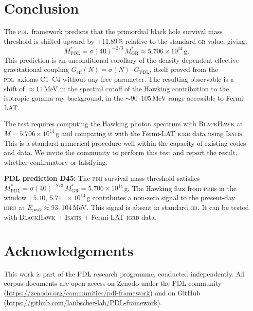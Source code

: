 \documentclass[12pt, a4paper]{article}
\theoremstyle{definition}
\newenvironment{prediction}[1][]{%
  \begin{tcolorbox}[colback=blue!5, colframe=blue!50!black,
    title={\textbf{Falsifiable prediction — #1}}, fonttitle=\bfseries]}
  {\end{tcolorbox}}
\newcommand{\PDL}{\textsc{pdl}}
\newcommand{\Geff}{G_{\mathrm{eff}}}
\newcommand{\GPDL}{G_{\mathrm{PDL}}}
\newcommand{\sigN}{\sigma(N)}
\newcommand{\MstarGR}{M^{*}_{\mathrm{GR}}}
\newcommand{\MstarPDL}{M^{*}_{\mathrm{PDL}}}
\begin{document}
\section{Conclusion}

The \PDL\ framework predicts that the primordial black hole survival mass threshold is shifted upward by $+11.89\%$ relative to the standard \textsc{gr} value, giving:
\begin{equation}
  \MstarPDL = \sigma(40)^{-2/3}\,\MstarGR \approx 5.706 \times 10^{14}\,\mathrm{g}.
\end{equation}
This prediction is an unconditional corollary of the density-dependent effective gravitational coupling $\Geff(N) = \sigN\cdot\GPDL$, itself proved from the \PDL\ axioms C1--C4 without any free parameter. The resulting observable is a shift of $\approx 11$\,MeV in the spectral cutoff of the Hawking contribution to the isotropic gamma-ray background, in the $\sim 90$--$105$\,MeV range accessible to Fermi-LAT.

The test requires computing the Hawking photon spectrum with \textsc{BlackHawk} at $M = 5.706\times10^{14}$\,g and comparing it with the Fermi-LAT \textsc{igrb} data using \textsc{Isatis}. This is a standard numerical procedure well within the capacity of existing codes and data. We invite the community to perform this test and report the result, whether confirmatory or falsifying.

\begin{prediction}[Summary]
\textbf{PDL prediction D45:} The \textsc{pbh} survival mass threshold satisfies $\MstarPDL = \sigma(40)^{-2/3}\,\MstarGR = 5.706\times10^{14}$\,g. The Hawking flux from \textsc{pbh}s in the window $[5.10,\,5.71]\times10^{14}$\,g contributes a non-zero signal to the present-day \textsc{igrb} at $E_{\mathrm{peak}} \approx 93$--$104$\,MeV. This signal is absent in standard \textsc{gr}. It can be tested with \textsc{BlackHawk} + \textsc{Isatis} + Fermi-LAT \textsc{igrb} data.
\end{prediction}

\section*{Acknowledgements}

This work is part of the PDL research programme, conducted independently. All corpus documents are open-access on Zenodo under the PDL community (\url{https://zenodo.org/communities/pdl-framework}) and on GitHub (\url{https://github.com/laubscher-lab/PDL-framework}).


\end{document}
